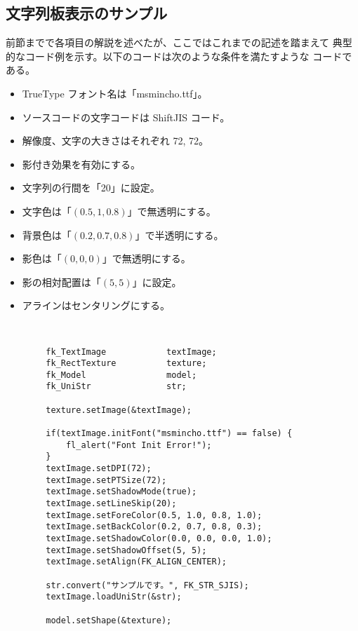 \subsection{文字列板表示のサンプル}
前節までで各項目の解説を述べたが、ここではこれまでの記述を踏まえて
典型的なコード例を示す。以下のコードは次のような条件を満たすような
コードである。
\begin{itemize}
 \item TrueType フォント名は「msmincho.ttf」。
 \item ソースコードの文字コードは ShiftJIS コード。
 \item 解像度、文字の大きさはそれぞれ 72, 72。
 \item 影付き効果を有効にする。
 \item 文字列の行間を「20」に設定。
 \item 文字色は「\((0.5, 1, 0.8)\)」で無透明にする。
 \item 背景色は「\((0.2, 0.7, 0.8)\)」で半透明にする。
 \item 影色は「\((0, 0, 0)\)」で無透明にする。
 \item 影の相対配置は「\((5, 5)\)」に設定。
 \item アラインはセンタリングにする。
\end{itemize}
~ \\
\begin{breakbox}
\begin{verbatim}
        fk_TextImage            textImage;
        fk_RectTexture          texture;
        fk_Model                model;
        fk_UniStr               str;

        texture.setImage(&textImage);

        if(textImage.initFont("msmincho.ttf") == false) {
            fl_alert("Font Init Error!");
        }
        textImage.setDPI(72);
        textImage.setPTSize(72);
        textImage.setShadowMode(true);
        textImage.setLineSkip(20);
        textImage.setForeColor(0.5, 1.0, 0.8, 1.0);
        textImage.setBackColor(0.2, 0.7, 0.8, 0.3);
        textImage.setShadowColor(0.0, 0.0, 0.0, 1.0);
        textImage.setShadowOffset(5, 5);
        textImage.setAlign(FK_ALIGN_CENTER);

        str.convert("サンプルです。", FK_STR_SJIS);
        textImage.loadUniStr(&str);

        model.setShape(&texture);
\end{verbatim}
\end{breakbox}

